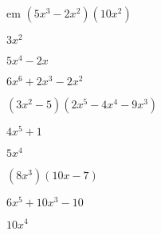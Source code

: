 \documentclass{article}
\begin{document}
\begin{multicols}{2}
em $(5x^{3}-2x^2)(10x^2)$\item $3x^2$\item $5x^{4}-2x$\item $6x^{6}+2x^{3}-2x^2$\item $(3x^2-5)(2x^{5}-4x^{4}-9x^{3})$\item $4x^{5}+1$\item $5x^{4}$\item $(8x^{3})(10x-7)$\item $6x^{5}+10x^{3}-10$\item $10x^{4}$\ite
\end{multicols}
\end{document}

